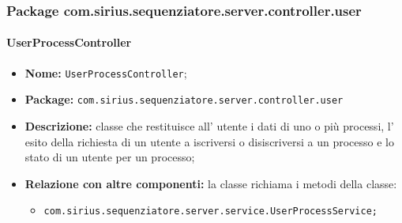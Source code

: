 \subsubsection{Package com.sirius.sequenziatore.server.controller.user}
\paragraph{UserProcessController}
	\begin{itemize}
		\item \textbf{Nome:} \texttt{UserProcessController};
		\item \textbf{Package:} \texttt{com.sirius.sequenziatore.server.controller.user}
		\item \textbf{Descrizione:} classe che restituisce all' utente i dati di uno o più processi, l' esito della richiesta di un utente a iscriversi o disiscriversi a un processo e lo stato di un utente per un processo;
		\item \textbf{Relazione con altre componenti:} la classe richiama i metodi della classe:
		\begin{itemize}
			\item \texttt{com.sirius.sequenziatore.server.service.UserProcessService;}
		\end{itemize}
	\end{itemize}
